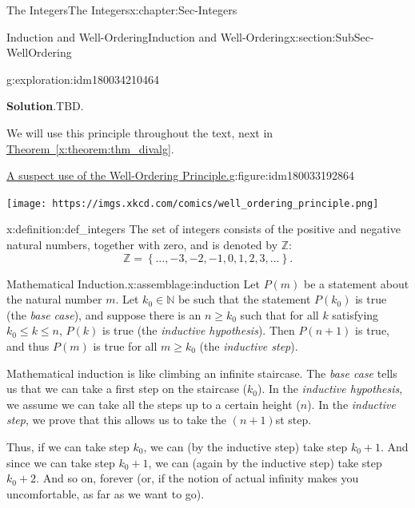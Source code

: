 \documentclass[oneside,10pt,]{book}
\newcommand{\blocktitlefont}{\relax}
\newcommand{\xreffont}{\relax}
\numberwithin{equation}{section}
\renewcommand{\le}{\leqslant}
\renewcommand{\ge}{\geqslant}
\newcommand{\set}[1]{\left\{ {#1} \right\}}
\def\Z{{\mathbb Z}}
\def\N{{\mathbb N}}
\begin{document}
\begin{chapterptx}{The Integers}{}{The Integers}{}{}{x:chapter:Sec-Integers}
\begin{sectionptx}{Induction and Well-Ordering}{}{Induction and Well-Ordering}{}{}{x:section:SubSec-WellOrdering}
\begin{exploration}{}{g:exploration:idm180034210464}
\begin{enumerate}
\end{enumerate}
\par\smallskip%
\noindent\textbf{\blocktitlefont Solution}.\hypertarget{g:solution:idm180034092672}{}\quad{}TBD.\end{exploration}
We will use this principle throughout the text, next in \hyperref[x:theorem:thm_divalg]{Theorem~{\xreffont\ref{x:theorem:thm_divalg}}}.%
\begin{figureptx}{\href{https://www.xkcd.com/2193/}{A suspect use of the Well-Ordering Principle.}}{g:figure:idm180033192864}{}%
\begin{image}{0.175}{0.65}{0.175}%
\texttt{[image: https://imgs.xkcd.com/comics/well\_ordering\_principle.png]}
\end{image}%
\tcblower
\end{figureptx}%
\begin{definition}{}{x:definition:def_integers}%
\index{\(\Z\)} The set of integers consists of the positive and negative natural numbers, together with zero, and is denoted by \(\Z\):%
\begin{equation*}
\Z = \set{\ldots, -3, -2, -1, 0, 1, 2, 3, \ldots}\text{.}
\end{equation*}
%
\end{definition}
\begin{assemblage}{Mathematical Induction.}{x:assemblage:induction}%
Let \(P(m)\) be a statement about the natural number \(m\)\footnotemark{}. Let \(k_0\in \N\) be such that the statement \(P(k_0)\) is true (the \emph{base case}), and suppose there is an \(n\ge k_0\) such that for all \(k\) satisfying \(k_0 \le k \le n\), \(P(k)\) is true (the \emph{inductive hypothesis}). Then \(P(n+1)\) is true, and thus \(P(m)\) is true for all \(m\ge k_0\) (the \emph{inductive step}).%
\end{assemblage}
%
Mathematical induction is like climbing an infinite staircase. The \emph{base case} tells us that we can take a first step on the staircase (\(k_0\)). In the \emph{inductive hypothesis}, we assume we can take all the steps up to a certain height (\(n\)). In the \emph{inductive step}, we prove that this allows us to take the \((n+1)\)st step.%
\par
Thus, if we can take step \(k_0\), we can (by the inductive step) take step \(k_0 + 1\). And since we can take step \(k_0 + 1\), we can (again by the inductive step) take step \(k_0 + 2\). And so on, forever (or, if the notion of actual infinity makes you uncomfortable, as far as we want to go).%

\end{sectionptx}
\end{chapterptx}
\end{document}
